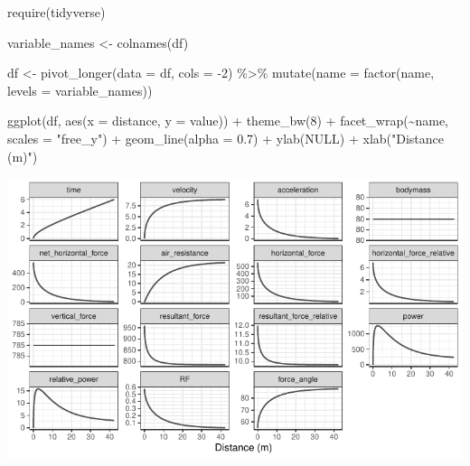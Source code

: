 \documentclass[fleqn,10pt]{wlpeerj} %
\newenvironment{Shaded}{\begin{snugshade}}{\end{snugshade}}
\newcommand{\AttributeTok}[1]{\textcolor[rgb]{0.77,0.63,0.00}{#1}}
\newcommand{\ConstantTok}[1]{\textcolor[rgb]{0.00,0.00,0.00}{#1}}
\newcommand{\DecValTok}[1]{\textcolor[rgb]{0.00,0.00,0.81}{#1}}
\newcommand{\FloatTok}[1]{\textcolor[rgb]{0.00,0.00,0.81}{#1}}
\newcommand{\FunctionTok}[1]{\textcolor[rgb]{0.00,0.00,0.00}{#1}}
\newcommand{\NormalTok}[1]{#1}
\newcommand{\OtherTok}[1]{\textcolor[rgb]{0.56,0.35,0.01}{#1}}
\newcommand{\SpecialCharTok}[1]{\textcolor[rgb]{0.00,0.00,0.00}{#1}}
\newcommand{\StringTok}[1]{\textcolor[rgb]{0.31,0.60,0.02}{#1}}
\begin{document}
\small

\begin{Shaded}
\begin{Highlighting}[]
\FunctionTok{require}\NormalTok{(tidyverse)}

\NormalTok{variable\_names }\OtherTok{\textless{}{-}} \FunctionTok{colnames}\NormalTok{(df)}

\NormalTok{df }\OtherTok{\textless{}{-}} \FunctionTok{pivot\_longer}\NormalTok{(}\AttributeTok{data =}\NormalTok{ df, }\AttributeTok{cols =} \SpecialCharTok{{-}}\DecValTok{2}\NormalTok{) }\SpecialCharTok{\%\textgreater{}\%}
  \FunctionTok{mutate}\NormalTok{(}\AttributeTok{name =} \FunctionTok{factor}\NormalTok{(name, }\AttributeTok{levels =}\NormalTok{ variable\_names))}

\FunctionTok{ggplot}\NormalTok{(df, }\FunctionTok{aes}\NormalTok{(}\AttributeTok{x =}\NormalTok{ distance, }\AttributeTok{y =}\NormalTok{ value)) }\SpecialCharTok{+}
  \FunctionTok{theme\_bw}\NormalTok{(}\DecValTok{8}\NormalTok{) }\SpecialCharTok{+}
  \FunctionTok{facet\_wrap}\NormalTok{(}\SpecialCharTok{\textasciitilde{}}\NormalTok{name, }\AttributeTok{scales =} \StringTok{"free\_y"}\NormalTok{) }\SpecialCharTok{+}
  \FunctionTok{geom\_line}\NormalTok{(}\AttributeTok{alpha =} \FloatTok{0.7}\NormalTok{) }\SpecialCharTok{+}
  \FunctionTok{ylab}\NormalTok{(}\ConstantTok{NULL}\NormalTok{) }\SpecialCharTok{+}
  \FunctionTok{xlab}\NormalTok{(}\StringTok{"Distance (m)"}\NormalTok{)}
\end{Highlighting}
\end{Shaded}

\begin{center}\includegraphics[width=0.9\linewidth]{paper_files/figure-latex/unnamed-chunk-7-1} \end{center}

\normalsize
\end{document}
